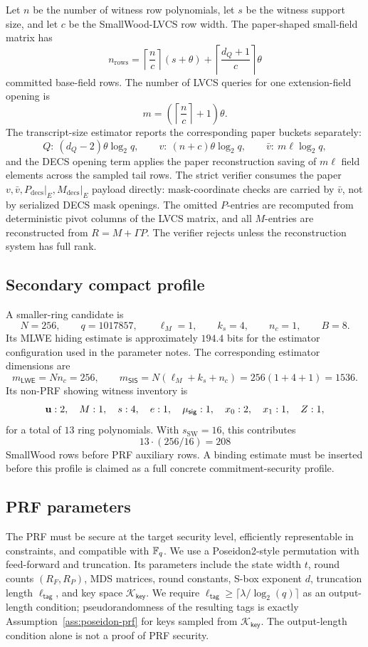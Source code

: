 Let \(n\) be the number of witness row polynomials, let \(s\) be the witness support size, and let \(c\) be the
SmallWood-LVCS row width.  The paper-shaped small-field matrix has
\[
  n_{\mathrm{rows}}
    =
    \left\lceil \frac{n}{c} \right\rceil (s+\theta)
    +
    \left\lceil \frac{d_Q+1}{c} \right\rceil \theta
\]
committed base-field rows.  The number of LVCS queries for one extension-field opening is
\[
  m
    =
    \left(\left\lceil \frac{n}{c} \right\rceil + 1\right)\theta .
\]
The transcript-size estimator reports the corresponding paper buckets separately:
\[
  Q:\ (d_Q-2)\theta\log_2 q,
  \qquad
  v:\ (n+c)\theta\log_2 q,
  \qquad
  \bar v:\ m\ell\log_2 q,
\]
and the DECS opening term applies the paper reconstruction saving of \(m\ell\) field elements across the sampled
tail rows.  The strict verifier consumes the paper \(v,\bar v,P_{\mathrm{decs}}\vert_E,M_{\mathrm{decs}}\vert_E\)
payload directly: mask-coordinate checks are carried by \(\bar v\), not by serialized DECS mask openings.  The
omitted \(P\)-entries are recomputed from deterministic pivot columns of the LVCS matrix, and all \(M\)-entries are
reconstructed from \(R=M+\Gamma P\).  The verifier rejects unless the reconstruction system has full rank.

\subsection{Secondary compact profile}
A smaller-ring candidate is
\[
  N=256,
  \qquad
  q=1017857,
  \qquad
  \ell_M=1,
  \qquad
  k_s=4,
  \qquad
  n_c=1,
  \qquad
  B=8.
\]
Its MLWE hiding estimate is approximately \(194.4\) bits for the estimator configuration used in the parameter
notes.  The corresponding estimator dimensions are
\[
  m_{\mathsf{LWE}}=Nn_c=256,
  \qquad
  m_{\mathsf{SIS}}=N(\ell_M+k_s+n_c)=256(1+4+1)=1536.
\]
Its non-PRF showing witness inventory is
\[
  \mathbf{u}:2,
  \quad M:1,
  \quad s:4,
  \quad e:1,
  \quad \mu_{\mathsf{sig}}:1,
  \quad x_0:2,
  \quad x_1:1,
  \quad Z:1,
\]
for a total of \(13\) ring polynomials.  With \(s_{\mathrm{SW}}=16\), this contributes
\[
  13\cdot(256/16)=208
\]
SmallWood rows before PRF auxiliary rows.  A binding estimate must be inserted before this profile is claimed as a
full concrete commitment-security profile.

\subsection{PRF parameters}
The PRF must be secure at the target security level, efficiently representable in constraints, and compatible with
\(\mathbb{F}_q\).  We use a Poseidon2-style permutation with feed-forward and truncation.  Its parameters include the state
width \(t\), round counts \((R_F,R_P)\), MDS matrices, round constants, S-box exponent \(d\), truncation length
\(\ell_{\mathsf{tag}}\), and key space \(\mathcal K_{\mathsf{key}}\).  We require
\(\ell_{\mathsf{tag}}\ge\lceil\lambda/\log_2(q)\rceil\) as an output-length condition; pseudorandomness of the
resulting tags is exactly Assumption~\ref{ass:poseidon-prf} for keys sampled from
\(\mathcal K_{\mathsf{key}}\).  The output-length condition alone is not a proof of PRF security.
